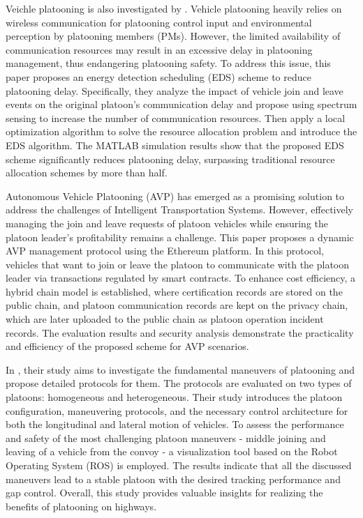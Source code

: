 Veichle platooning is also investigated by \cite{lit_3}. Vehicle platooning heavily relies on wireless communication for platooning control input and environmental perception by platooning members (PMs). However, the limited availability of communication resources may result in an excessive delay in platooning management, thus endangering platooning safety. To address this issue, this paper proposes an energy detection scheduling (EDS) scheme to reduce platooning delay. Specifically, they analyze the impact of vehicle join and leave events on the original platoon's communication delay and propose using spectrum sensing to increase the number of communication resources. Then apply a local optimization algorithm to solve the resource allocation problem and introduce the EDS algorithm. The MATLAB simulation results show that the proposed EDS scheme significantly reduces platooning delay, surpassing traditional resource allocation schemes by more than half.


Autonomous Vehicle Platooning (AVP) has emerged as a promising solution to address the challenges of Intelligent Transportation Systems. However, effectively managing the join and leave requests of platoon vehicles while ensuring the platoon leader's profitability remains a challenge. This paper \cite{lit_4} proposes a dynamic AVP management protocol using the Ethereum platform. In this protocol, vehicles that want to join or leave the platoon to communicate with the platoon leader via transactions regulated by smart contracts. To enhance cost efficiency, a hybrid chain model is established, where certification records are stored on the public chain, and platoon communication records are kept on the privacy chain, which are later uploaded to the public chain as platoon operation incident records. The evaluation results and security analysis demonstrate the practicality and efficiency of the proposed scheme for AVP scenarios.


In \cite{lit_5}, their study aims to investigate the fundamental maneuvers of platooning and propose detailed protocols for them. The protocols are evaluated on two types of platoons: homogeneous and heterogeneous. Their study introduces the platoon configuration, maneuvering protocols, and the necessary control architecture for both the longitudinal and lateral motion of vehicles. To assess the performance and safety of the most challenging platoon maneuvers - middle joining and leaving of a vehicle from the convoy - a visualization tool based on the Robot Operating System (ROS) is employed. The results indicate that all the discussed maneuvers lead to a stable platoon with the desired tracking performance and gap control. Overall, this study provides valuable insights for realizing the benefits of platooning on highways.